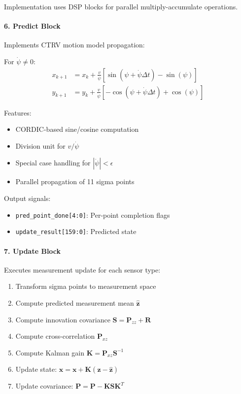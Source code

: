 \documentclass[12pt,a4paper]{report}
\begin{document}
Implementation uses DSP blocks for parallel multiply-accumulate operations.

\paragraph{6. Predict Block}
Implements CTRV motion model propagation:

For $\dot{\psi} \neq 0$:
\begin{align}
x_{k+1} &= x_k + \frac{v}{\dot{\psi}}[\sin(\psi + \dot{\psi}\Delta t) - \sin(\psi)] \\
y_{k+1} &= y_k + \frac{v}{\dot{\psi}}[-\cos(\psi + \dot{\psi}\Delta t) + \cos(\psi)]
\end{align}

Features:
\begin{itemize}
    \item CORDIC-based sine/cosine computation
    \item Division unit for $v/\dot{\psi}$
    \item Special case handling for $|\dot{\psi}| < \epsilon$
    \item Parallel propagation of 11 sigma points
\end{itemize}

Output signals:
\begin{itemize}
    \item \texttt{pred\_point\_done[4:0]}: Per-point completion flags
    \item \texttt{update\_result[159:0]}: Predicted state
\end{itemize}

\paragraph{7. Update Block}
Executes measurement update for each sensor type:

\begin{enumerate}
    \item Transform sigma points to measurement space
    \item Compute predicted measurement mean $\hat{\mathbf{z}}$
    \item Compute innovation covariance $\mathbf{S} = \mathbf{P}_{zz} + \mathbf{R}$
    \item Compute cross-correlation $\mathbf{P}_{xz}$
    \item Compute Kalman gain $\mathbf{K} = \mathbf{P}_{xz}\mathbf{S}^{-1}$
    \item Update state: $\mathbf{x} = \mathbf{x} + \mathbf{K}(\mathbf{z} - \hat{\mathbf{z}})$
    \item Update covariance: $\mathbf{P} = \mathbf{P} - \mathbf{K}\mathbf{S}\mathbf{K}^T$
\end{enumerate}
\end{document}
